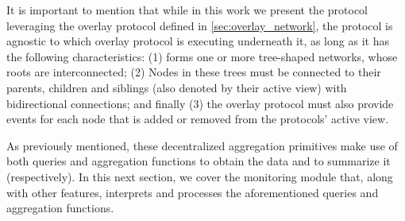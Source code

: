 It is important to mention that while in this work we present the protocol leveraging the overlay protocol defined in \ref{sec:overlay_network}, the protocol is agnostic to which overlay protocol is executing underneath it, as long as it has the following characteristics: (1) forms one or more tree-shaped networks, whose roots are interconnected; (2) Nodes in these trees must be connected to their parents, children and siblings (also denoted by their active view) with bidirectional connections; and finally (3) the overlay protocol must also provide events for each node that is added or removed from the protocols' active view.

% 
As previously mentioned, these decentralized aggregation primitives make use of both queries and aggregation functions to obtain the data and to summarize it (respectively). In this next section, we cover the monitoring module that, along with other features, interprets and processes the aforementioned queries and aggregation functions.